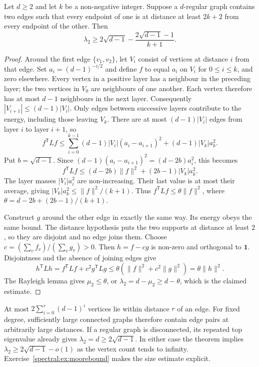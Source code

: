 \begin{theorem}\label{spectral:thm:alonboppana}
Let $d\ge2$ and let $k$ be a non-negative integer. Suppose a $d$-regular graph contains two edges such that every endpoint of one is at distance at least $2k+2$ from every endpoint of the other. Then
\[
\lambda_2\ge2\sqrt{d-1}-\frac{2\sqrt{d-1}-1}{k+1}.
\]
\end{theorem}
\begin{proof}
Around the first edge $\{v_1,v_2\}$, let $V_i$ consist of vertices at distance $i$ from that edge. Set $a_i=(d-1)^{-i/2}$ and define $f$ to equal $a_i$ on $V_i$ for $0\le i\le k$, and zero elsewhere.
Every vertex in a positive layer has a neighbour in the preceding layer; the two vertices in $V_0$ are neighbours of one another. Each vertex therefore has at most $d-1$ neighbours in the next layer. Consequently $|V_{i+1}|\le(d-1)|V_i|$.
Only edges between successive layers contribute to the energy, including those leaving $V_k$. There are at most $(d-1)|V_i|$ edges from layer $i$ to layer $i+1$, so
\[
f^{\mathsf T}Lf\le\sum_{i=0}^{k-1}(d-1)|V_i|(a_i-a_{i+1})^2
+(d-1)|V_k|a_k^2.
\]
Put $b=\sqrt{d-1}$. Since $(d-1)(a_i-a_{i+1})^2=(d-2b)a_i^2$, this becomes
\[
f^{\mathsf T}Lf\le(d-2b)\|f\|^2+(2b-1)|V_k|a_k^2.
\]
The layer masses $|V_i|a_i^2$ are non-increasing. Their last value is at most their average, giving $|V_k|a_k^2\le\|f\|^2/(k+1)$. Thus
$f^{\mathsf T}Lf\le\theta\|f\|^2$, where $\theta=d-2b+(2b-1)/(k+1)$.

Construct $g$ around the other edge in exactly the same way. Its energy obeys the same bound. The distance hypothesis puts the two supports at distance at least $2$, so they are disjoint and no edge joins them. Choose $c=(\sum_v f_v)/(\sum_v g_v)>0$. Then $h=f-cg$ is non-zero and orthogonal to $\mathbf1$. Disjointness and the absence of joining edges give
\[
h^{\mathsf T}Lh=f^{\mathsf T}Lf+c^2g^{\mathsf T}Lg
\le\theta(\|f\|^2+c^2\|g\|^2)=\theta\|h\|^2.
\]
The Rayleigh lemma gives $\mu_2\le\theta$, or $\lambda_2=d-\mu_2\ge d-\theta$, which is the claimed estimate.
\end{proof}

At most $2\sum_{i=0}^r(d-1)^i$ vertices lie within distance $r$ of an edge. For fixed degree, sufficiently large connected graphs therefore contain edge pairs at arbitrarily large distances. If a regular graph is disconnected, its repeated top eigenvalue already gives $\lambda_2=d\ge2\sqrt{d-1}$. In either case the theorem implies $\lambda_2\ge2\sqrt{d-1}-o(1)$ as the vertex count tends to infinity. Exercise~\ref{spectral:ex:moorebound} makes the size estimate explicit.

